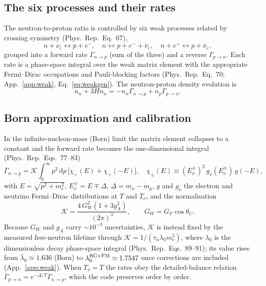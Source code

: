 \documentclass[11pt,a4paper]{article}
\newcommand{\dd}{\mathrm{d}}
\newcommand{\Tnu}{T_\nu}
\newcommand{\PR}{Phys.\ Rep.}
\newcommand{\Gap}{\Delta}
\newcommand{\Kw}{\mathcal{K}}
\begin{document}
\subsection{The six processes and their rates}
The neutron-to-proton ratio is controlled by six weak processes related by
crossing symmetry (\PR\ Eq.~67),
\begin{equation}
  n+\nu_e \leftrightarrow p+e^-, \quad
  n \leftrightarrow p+e^-+\bar\nu_e, \quad
  n+e^+ \leftrightarrow p+\bar\nu_e,
\label{eq:sixprocesses}
\end{equation}
grouped into a forward rate $\Gamma_{n\to p}$ (sum of the three) and a reverse
$\Gamma_{p\to n}$. Each rate is a phase-space integral over the weak matrix
element with the appropriate Fermi--Dirac occupations and Pauli-blocking factors
(\PR\ Eq.~70; App.~\ref{app:weak}, Eq.~\eqref{eq:weakgen}). The neutron-proton
density evolution is
\begin{equation}
  \dot n_n + 3Hn_n = -n_n\Gamma_{n\to p} + n_p\Gamma_{p\to n}.
\end{equation}

\subsection{Born approximation and calibration}
In the infinite-nucleon-mass (Born) limit the matrix element collapses to a
constant and the forward rate becomes the one-dimensional integral (\PR\
Eqs.~77--83)
\begin{equation}
  \overline\Gamma_{n\to p} = \Kw\!\int_0^\infty\! p^2\,\dd p\,
     \big[\chi_+(E)+\chi_+(-E)\big],
  \quad
  \chi_\pm(E)\equiv (E_\nu^\mp)^2\,g_\nu(E_\nu^\mp)\,g(-E),
\label{eq:born}
\end{equation}
with $E=\sqrt{p^2+m_e^2}$, $E_\nu^\mp=E\mp\Gap$, $\Gap=m_n-m_p$, $g$ and $g_\nu$
the electron and neutrino Fermi--Dirac distributions at $T$ and $\Tnu$, and the
normalisation
\begin{equation}
  \Kw = \frac{4\,G_W^2(1+3g_A^2)}{(2\pi)^3}, \qquad G_W = G_F\cos\theta_C .
\label{eq:K}
\end{equation}
Because $G_W$ and $g_A$ carry $\sim\!10^{-3}$ uncertainties, $\Kw$ is instead
fixed by the measured free-neutron lifetime through $\Kw=1/(\tau_n\lambda_0
m_e^5)$, where $\lambda_0$ is the dimensionless decay phase-space integral (\PR\
Eqs.~89--91); its value rises from $\bar\lambda_0\simeq1.636$ (Born) to
$\lambda_0^{\rm RC+FM}\simeq1.7547$ once corrections are included
(App.~\ref{app:weak}). When $\Tnu=T$ the rates obey the detailed-balance
relation $\overline\Gamma_{p\to n}=e^{-\Gap/T}\overline\Gamma_{n\to p}$, which
the code preserves order by order.
\end{document}
